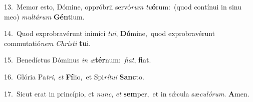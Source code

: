 {\numbfont\textcolor{\numbcolor}{13.}}~Memor esto, Dómine, oppróbrii servó\textit{rum} \textit{tu}\-\textbf{ó}rum:~\star (quod contínui in sinu meo) \textit{mul}\-\textit{tá}\textit{rum} \textbf{Gén}\-tium.\par
{\numbfont\textcolor{\numbcolor}{14.}}~Quod exprobravérunt inimíci \textit{tu}\-\textit{i}, \textbf{Dó}\-mine,~\star quod exprobravérunt commutatió\textit{nem} \textit{Chris}\-\textit{ti} \textbf{tu}\-i.\par
{\numbfont\textcolor{\numbcolor}{15.}}~Benedíctus Dóminus \textit{in} \textit{æ}\-\textbf{tér}num:~\star \textit{fi}\-\textit{at}, \textbf{fi}\-at.\par
{\numbfont\textcolor{\numbcolor}{16.}}~Glória Pa\-\textit{tri}\-, \textit{et} \textbf{Fí}\-lio,~\star et Spi\-\textit{rí}\-\textit{tu}\textit{i} \textbf{Sanc}\-to.\par
{\numbfont\textcolor{\numbcolor}{17.}}~Sicut erat in princípio, et \textit{nunc}\-, \textit{et} \textbf{sem}\-per,~\star et in sǽcula sæ\-\textit{cu}\-\textit{ló}\textit{rum}. \textbf{A}\-men.\par

